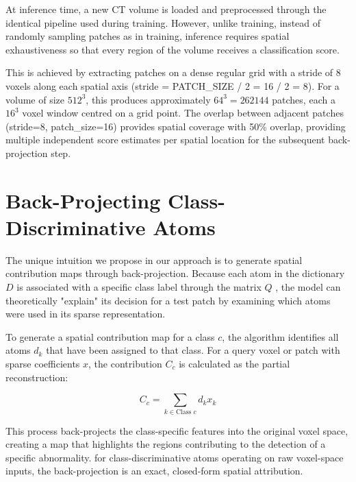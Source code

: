 At inference time, a new CT volume is loaded and preprocessed through the identical pipeline used during training.
However, unlike training, instead of randomly sampling patches as in training,
inference requires spatial exhaustiveness so that every region of the volume receives a classification score.

This is achieved by extracting patches on a dense regular grid with a stride of 8 voxels along each spatial axis
(stride = PATCH\_SIZE / 2 = 16 / 2 = 8).
For a volume of size $ 512^3 $, this produces approximately $ 64^3 = 262144 $ patches, each a $ 16^3 $ voxel window centred on a grid point.
The overlap between adjacent patches (stride=8, patch\_size=16) provides spatial coverage with 50\% overlap,
providing multiple independent score estimates per spatial location for the subsequent back-projection step.

\section{Back-Projecting Class-Discriminative Atoms}
The unique intuition we propose in our approach is to generate spatial contribution maps through back-projection. Because
each atom in the dictionary $D$ is associated with a specific class label through the matrix $Q$ \cite{jiang2013lcksvd}, the model can theoretically
"explain" its decision for a test patch by examining which atoms were used in its sparse representation.

To generate a spatial contribution map for a class $c$, the algorithm identifies all atoms $d_k$ that have been assigned
to that class. For a query voxel or patch with sparse coefficients $x$, the contribution $C_c$ is calculated as the
partial reconstruction:

$$C_c = \sum_{k \in \text{Class } c} d_k x_k$$

This process back-projects the class-specific features into the original voxel space, creating a map
that highlights the regions contributing to the detection of a specific abnormality. for class-discriminative atoms
operating on raw voxel-space inputs, the back-projection is an exact, closed-form spatial attribution.

